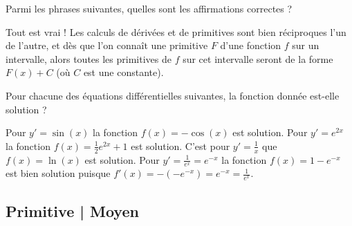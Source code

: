 \begin{question}
Parmi les phrases suivantes, quelles sont les affirmations correctes ?
\begin{answers}  
\end{answers}
\begin{explanations}
Tout est vrai ! Les calculs de dérivées et de primitives sont bien réciproques l'un de l'autre, et dès que l'on connaît une primitive \(F\) d'une fonction \(f\) sur un intervalle, alors toutes les primitives de \(f\) sur cet intervalle seront de la forme $F(x) + C$ (où $C$ est une constante).
\end{explanations}
\end{question}


\begin{question}
Pour chacune des équations différentielles suivantes, la fonction donnée est-elle solution ?
\begin{answers}  
\end{answers}
\begin{explanations}
Pour $y'=\sin(x)$ la fonction $f(x) = -\cos(x)$ est solution.
Pour $y'=e^{2x}$ la fonction $f(x) =\frac12 e^{2x}+1$ est solution.
C'est pour $y'=\frac1x$ que $f(x) = \ln(x)$ est solution.
Pour $y'=\frac{1}{e^x}=e^{-x}$ la fonction $f(x) = 1-e^{-x}$ est bien solution puisque $f'(x) = -(-e^{-x})=e^{-x} = \frac{1}{e^x}$.
\end{explanations}
\end{question}



\subsection{Primitive | Moyen}



